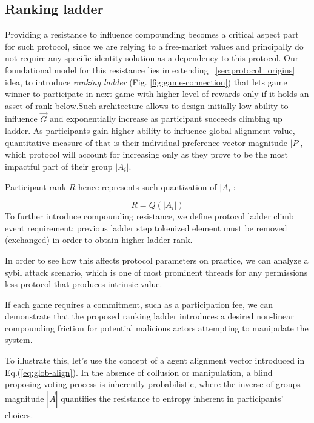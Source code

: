 \documentclass{article}
\begin{document}
\begin{CJK}{UTF8}{gbsn}
\begin{multicols}{2}
        \subsection{Ranking ladder}

        Providing a resistance to influence compounding becomes a critical aspect part for such protocol, since we are relying to a free-market values and principally do not require any specific identity solution as a dependency to this protocol.
        Our foundational model for this resistance lies in extending  ~\ref{sec:protocol_origins} idea, to introduce \textit{ranking ladder} (Fig. \ref*{fig:game-connection}) that lets game winner to participate in next game with higher level of rewards only if it holds an asset of rank below.Such architecture allows to design initially low ability to influence ${\vec{G}}$ and exponentially increase as participant succeeds climbing up ladder. As participants gain higher ability to influence global alignment value, quantitative measure of that is their individual preference vector magnitude $|P|$, which protocol will account for increasing only as they prove to be the most impactful part of their group $|A_i|$.
        
        Participant rank $R$ hence represents such quantization of $|A_i|$:

        \begin{equation}
            \label{eq:comp-quant}
            R = Q(|A_i|)
        \end{equation}
        To further introduce compounding resistance, we define protocol ladder climb event requirement: previous ladder step tokenized element must be removed (exchanged) in order to obtain higher ladder rank.


        In order to see how this affects protocol parameters on practice, we can analyze a sybil attack scenario, which is one of most prominent threads for any permissions less protocol that produces intrinsic value.


        If each game requires a commitment, such as a participation fee, we can demonstrate that the proposed ranking ladder introduces a desired non-linear compounding friction for potential malicious actors attempting to manipulate the system.

        To illustrate this, let's use the concept of a agent alignment vector introduced in Eq.(\ref*{eq:glob-align}). In the absence of collusion or manipulation, a blind proposing-voting process is inherently probabilistic, where the inverse of groups  magnitude $|\vec{A}|$ quantifies the resistance to entropy inherent in participants' choices.



\end{multicols}
\end{CJK}
\end{document}
